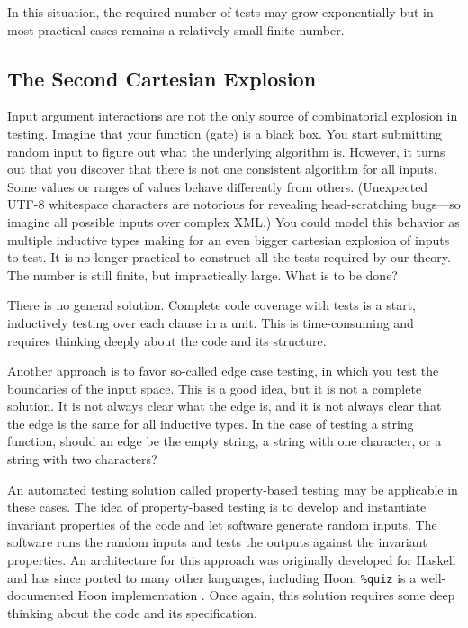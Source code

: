 \documentclass[twoside]{article}
\begin{document}
In this situation, the required number of tests may grow exponentially but in most practical cases remains a relatively small finite number.

\subsection{The Second Cartesian Explosion}

Input argument interactions are not the only source of combinatorial explosion in testing. Imagine that your function (gate) is a black box. You start submitting random input to figure out what the underlying algorithm is. However, it turns out that you discover that there is not one consistent algorithm for all inputs. Some values or ranges of values behave differently from others. (Unexpected UTF-8 whitespace characters are notorious for revealing head-scratching bugs—so imagine all possible inputs over complex XML.) You could model this behavior as multiple inductive types making for an even bigger cartesian explosion of inputs to test. It is no longer practical to construct all the tests required by our theory. The number is still finite, but impractically large. What is to be done?

There is no general solution. Complete code coverage with tests is a start, inductively testing over each clause in a unit. This is time-consuming and requires thinking deeply about the code and its structure.

Another approach is to favor so-called edge case testing, in which you test the boundaries of the input space. This is a good idea, but it is not a complete solution. It is not always clear what the edge is, and it is not always clear that the edge is the same for all inductive types. In the case of testing a string function, should an edge be the empty string, a string with one character, or a string with two characters? 

An automated testing solution called property-based testing may be applicable in these cases. The idea of property-based testing is to develop and instantiate invariant properties of the code and let software generate random inputs. The software runs the random inputs and tests the outputs against the invariant properties. An architecture for this approach was originally developed for Haskell and has since ported to many other languages, including Hoon.  \texttt{\%quiz} is a well-documented Hoon implementation .  Once again, this solution requires some deep thinking about the code and its specification.
\end{document}
